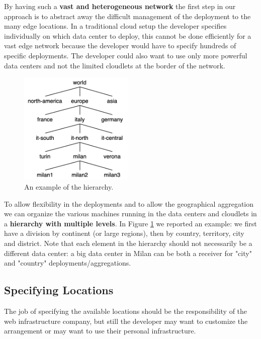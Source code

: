 By having such a \textbf{vast and heterogeneous network} the first step in our approach is to abstract away the difficult management of the deployment to the many edge locations.
In a traditional cloud setup the developer specifies individually on which data center to deploy, this cannot be done efficiently for a vast edge network because the developer would have to specify hundreds of specific deployments.
The developer could also want to use only more powerful data centers and not the limited cloudlets at the border of the network.

\begin{figure} %
\caption{An example of the hierarchy.}
\label{fig:hierarchy}
\includegraphics[width=5.5cm]{Figures/Solution/hierarchy.png}
\end{figure} 

To allow flexibility in the deployments and to allow the geographical aggregation we can organize the various machines running in the data centers and cloudlets in a \textbf{hierarchy with multiple levels}.
In Figure \ref{fig:hierarchy} we reported an example: we first have a division by continent (or large regions), then by country, territory, city and district.
Note that each element in the hierarchy should not necessarily be a different data center: a big data center in Milan can be both a receiver for "city" and "country" deployments/aggregations.
\vspace{0.5cm}


\subsection{Specifying Locations}
The job of specifying the available locations should be the responsibility of the web infrastructure company, but still the developer may want to customize the arrangement or may want to use their personal infrastructure. 

